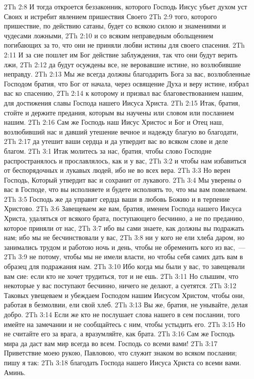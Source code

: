 \vs 2Th 2:8 И тогда откроется беззаконник, которого Господь Иисус убьет духом уст Своих и истребит явлением пришествия Своего
\vs 2Th 2:9 того, которого пришествие, по действию сатаны, будет со всякою силою и знамениями и чудесами ложными,
\vs 2Th 2:10 и со всяким неправедным обольщением погибающих за то, что они не приняли любви истины для своего спасения.
\vs 2Th 2:11 И за сие пошлет им Бог действие заблуждения, так что они будут верить лжи,
\vs 2Th 2:12 да будут осуждены все, не веровавшие истине, но возлюбившие неправду.
\rsbpar\vs 2Th 2:13 Мы же всегда должны благодарить Бога за вас, возлюбленные Господом братия, что Бог от начала, через освящение Духа и веру истине, избрал вас ко спасению,
\vs 2Th 2:14 к которому и призвал вас благовествованием нашим, для достижения славы Господа нашего Иисуса Христа.
\rsbpar\vs 2Th 2:15 Итак, братия, стойте и держите предания, которым вы научены или словом или посланием нашим.
\vs 2Th 2:16 Сам же Господь наш Иисус Христос и Бог и Отец наш, возлюбивший нас и давший утешение вечное и надежду благую во благодати,
\vs 2Th 2:17 да утешит ваши сердца и да утвердит вас во всяком слове и деле благом.
\vs 2Th 3:1 Итак молитесь за нас, братия, чтобы слово Господне распространялось и прославлялось, как и у вас,
\vs 2Th 3:2 и чтобы нам избавиться от беспорядочных и лукавых людей, ибо не во всех вера.
\vs 2Th 3:3 Но верен Господь, Который утвердит вас и сохранит от лукавого.
\vs 2Th 3:4 Мы уверены о вас в Господе, что вы исполняете и будете исполнять то, что мы вам повелеваем.
\vs 2Th 3:5 Господь же да управит сердца ваши в любовь Божию и в терпение Христово.
\rsbpar\vs 2Th 3:6 Завещеваем же вам, братия, именем Господа нашего Иисуса Христа, удаляться от всякого брата, поступающего бесчинно, а не по преданию, которое приняли от нас,
\vs 2Th 3:7 ибо вы сами знаете, как должны вы подражать нам; ибо мы не бесчинствовали у вас,
\vs 2Th 3:8 ни у кого не ели хлеба даром, но занимались трудом и работою ночь и день, чтобы не обременить кого из вас,~---
\vs 2Th 3:9 не потому, чтобы мы не имели власти, но чтобы себя самих дать вам в образец для подражания нам.
\vs 2Th 3:10 Ибо когда мы были у вас, то завещевали вам сие: если кто не хочет трудиться, тот и не ешь.
\vs 2Th 3:11 Но слышим, что некоторые у вас поступают бесчинно, ничего не делают, а суетятся.
\vs 2Th 3:12 Таковых увещеваем и убеждаем Господом нашим Иисусом Христом, чтобы они, работая в безмолвии, ели свой хлеб.
\vs 2Th 3:13 Вы же, братия, не унывайте, делая добро.
\vs 2Th 3:14 Если же кто не послушает слова нашего в сем послании, того имейте на замечании и не сообщайтесь с ним, чтобы устыдить его.
\vs 2Th 3:15 Но не считайте его за врага, а вразумляйте, как брата.
\vs 2Th 3:16 Сам же Господь мира да даст вам мир всегда во всем. Господь со всеми вами!
\rsbpar\vs 2Th 3:17 Приветствие моею рукою, Павловою, что служит знаком во всяком послании; пишу я так:
\vs 2Th 3:18 благодать Господа нашего Иисуса Христа со всеми вами. Аминь.
